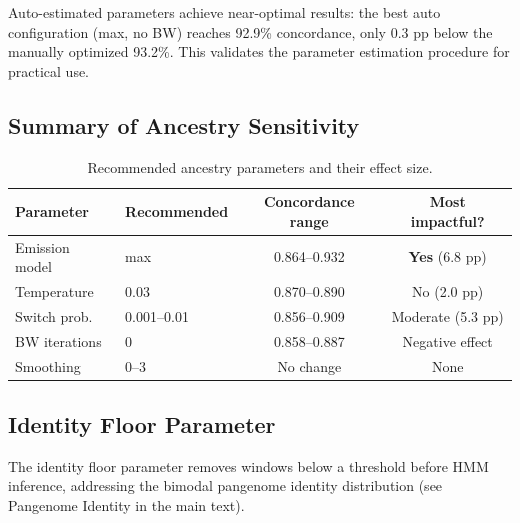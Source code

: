 \documentclass[11pt]{article}
\begin{document}
Auto-estimated parameters achieve near-optimal results: the best auto configuration (max, no BW) reaches 92.9\% concordance, only 0.3 pp below the manually optimized 93.2\%. This validates the parameter estimation procedure for practical use.

\subsection{Summary of Ancestry Sensitivity}
\label{sec:ancestry_sensitivity_summary}

\begin{table}[ht]
\centering
\caption{Recommended ancestry parameters and their effect size.}
\label{tab:ancestry_recommendations}
\begin{tabular}{llcc}
\hline
\textbf{Parameter} & \textbf{Recommended} & \textbf{Concordance range} & \textbf{Most impactful?} \\
\hline
Emission model & max & 0.864--0.932 & \textbf{Yes} (6.8 pp) \\
Temperature & 0.03 & 0.870--0.890 & No (2.0 pp) \\
Switch prob. & 0.001--0.01 & 0.856--0.909 & Moderate (5.3 pp) \\
BW iterations & 0 & 0.858--0.887 & Negative effect \\
Smoothing & 0--3 & No change & None \\
\hline
\end{tabular}
\end{table}

\subsection{Identity Floor Parameter}
\label{sec:supp_identity_floor}

The identity floor parameter removes windows below a threshold before HMM inference, addressing the bimodal pangenome identity distribution (see Pangenome Identity in the main text).
\end{document}
